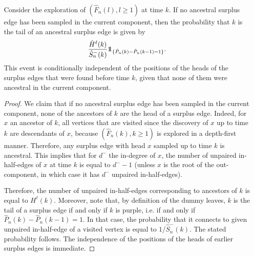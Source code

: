 \begin{lemma}\label{lemma.probancestral}
Consider the exploration of $(\hat{F}_n(l),l\geq 1)$ at time $k$. If no ancestral surplus edge has been sampled in the current component, then the probability that $k$ is the tail of an ancestral surplus edge is given by 
$$\frac{\hat{H}^\ell(k)}{\hat{S}_n^-(k)}\one_{\{\hat{P}_n(k)-\hat{P}_n(k-1)=1\}}.$$
This event is conditionally independent of the positions of the heads of the surplus edges that were found before time $k$, given that none of them were ancestral in the current component.
\end{lemma}
\begin{proof}
We claim that if no ancestral surplus edge has been sampled in the current component, none of the ancestors of $k$ are the head of a surplus edge. Indeed, for $x$ an ancestor of $k$, all vertices that are visited since the discovery of $x$ up to time $k$ are descendants of $x$, because $(\hat{F}_n(k),k\geq 1)$ is explored in a depth-first manner. Therefore, any surplus edge with head $x$ sampled up to time $k$ is ancestral. This implies that for $d^-$ the in-degree of $x$, the number of unpaired in-half-edges of $x$ at time $k$ is equal to $d^--1$ (unless $x$ is the root of the out-component, in which case it has $d^-$ unpaired in-half-edges).

Therefore, the number of unpaired in-half-edges corresponding to ancestors of $k$ is equal to $H^\ell(k)$. Moreover, note that, by definition of the dummy leaves, $k$ is the tail of a surplus edge if and only if $k$ is purple, i.e. if and only if $\hat{P}_n(k)-\hat{P}_n(k-1)=1$. In that case, the probability that it connects to given unpaired in-half-edge of a visited vertex is equal to $1/\hat{S}_n^-(k)$. The stated probability follows. The independence of the positions of the heads of earlier surplus edges is immediate.
\end{proof}

